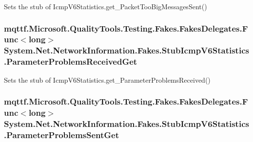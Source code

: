 Sets the stub of Icmp\-V6\-Statistics.\-get\-\_\-\-Packet\-Too\-Big\-Messages\-Sent()

\hypertarget{class_system_1_1_net_1_1_network_information_1_1_fakes_1_1_stub_icmp_v6_statistics_a99b5d855016ca31e0b27642df58bb202}{
\subsubsection[{Parameter\-Problems\-Received\-Get}]{\setlength{\rightskip}{0pt plus 5cm}mqttf.\-Microsoft.\-Quality\-Tools.\-Testing.\-Fakes.\-Fakes\-Delegates.\-Func$<$long$>$ System.\-Net.\-Network\-Information.\-Fakes.\-Stub\-Icmp\-V6\-Statistics.\-Parameter\-Problems\-Received\-Get}}\label{class_system_1_1_net_1_1_network_information_1_1_fakes_1_1_stub_icmp_v6_statistics_a99b5d855016ca31e0b27642df58bb202}


Sets the stub of Icmp\-V6\-Statistics.\-get\-\_\-\-Parameter\-Problems\-Received()

\hypertarget{class_system_1_1_net_1_1_network_information_1_1_fakes_1_1_stub_icmp_v6_statistics_a7c10d5e05f28916a2621895f8a153de0}{
\subsubsection[{Parameter\-Problems\-Sent\-Get}]{\setlength{\rightskip}{0pt plus 5cm}mqttf.\-Microsoft.\-Quality\-Tools.\-Testing.\-Fakes.\-Fakes\-Delegates.\-Func$<$long$>$ System.\-Net.\-Network\-Information.\-Fakes.\-Stub\-Icmp\-V6\-Statistics.\-Parameter\-Problems\-Sent\-Get}}\label{class_system_1_1_net_1_1_network_information_1_1_fakes_1_1_stub_icmp_v6_statistics_a7c10d5e05f28916a2621895f8a153de0}


